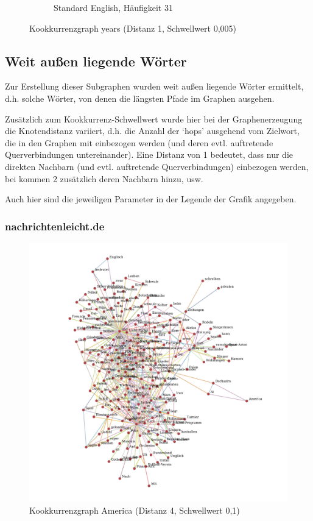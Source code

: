 \documentclass[11pt, a4paper]{article}
\begin{document}
\begin{figure}[hp!]
\begin{subfigure}[b]{0.5\textwidth}
        \caption{Standard English, Häufigkeit 31}
    \end{subfigure}
    \caption{Kookkurrenzgraph years (Distanz 1, Schwellwert 0,005)}
    \label{fig:hw-years}
\end{figure}


\pagebreak
\subsection{Weit außen liegende Wörter}
\label{sec:aussen_liegende}

Zur Erstellung dieser Subgraphen wurden weit außen liegende Wörter ermittelt,
d.h. solche Wörter, von denen die längsten Pfade im Graphen ausgehen.

Zusätzlich zum Kookkurrenz-Schwellwert wurde hier bei der Graphenerzeugung
die Knotendistanz variiert, d.h. die Anzahl der `hops' ausgehend vom Zielwort,
die in den Graphen mit einbezogen werden (und deren evtl. auftretende
Querverbindungen untereinander).
Eine Distanz von 1 bedeutet, dass nur die direkten Nachbarn (und evtl.
auftretende Querverbindungen) einbezogen werden, bei kommen 2 zusätzlich deren
Nachbarn hinzu, usw.

Auch hier sind die jeweiligen Parameter in der Legende der Grafik angegeben.

\subsubsection{nachrichtenleicht.de}

\begin{figure}[hp!]
    \centering
        \includegraphics[scale=.4]{../../data/results/longpath_wordgraphs/nl/graph_America.pdf}
    \caption{Kookkurrenzgraph America (Distanz 4, Schwellwert 0,1)}
    \label{fig:lp-america}
\end{figure}
\end{document}
